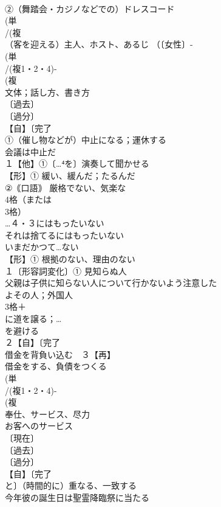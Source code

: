 \documentclass[8pt]{extreport}
\begin{document}
\begin{CJK}{UTF8}{min}
\\	②（舞踏会・カジノなどでの）ドレスコード 
\\	(単
\\	/(複
\\	（客を迎える）主人、ホスト、あるじ （〔女性〕-
\\	(単
\\	/(複1・2・4)-
\\	(複
\\	文体；話し方、書き方 
\\	〔過去〕
\\	〔過分〕
\\	【自】〔完了
\\	①（催し物などが）中止になる；運休する 
\\	会議は中止だ
\\	１【他】①〔…⁴を〕演奏して聞かせる 
\\	【形】① 緩い、緩んだ；たるんだ 
\\	②｟口語｠ 厳格でない、気楽な
\\	4格（または
\\	3格）
\\	…４・３にはもったいない 
\\	それは捨てるにはもったいない
\\	いまだかつて…ない
\\	【形】① 根拠のない、理由のない
\\	１〔形容詞変化〕① 見知らぬ人 
\\	父親は子供に知らない人について行かないよう注意した 
\\	よその人；外国人
\\	3格＋
\\	に道を譲る；…
\\	を避ける
\\	２【自】〔完了
\\	借金を背負い込む　３【再】
\\	借金をする、負債をつくる
\\	(単
\\	/(複1・2・4)-
\\	(複
\\	奉仕、サービス、尽力 
\\	お客へのサービス
\\	〔現在〕
\\	〔過去〕
\\	〔過分〕
\\	【自】〔完了
\\	と〕（時間的に）重なる、一致する 
\\	今年彼の誕生日は聖霊降臨祭に当たる

\end{CJK}
\end{document}
